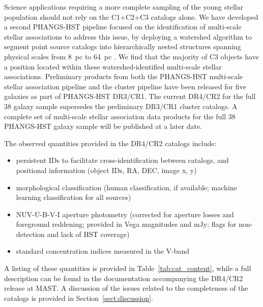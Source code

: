 \documentclass[linenumbers]{aastex63}
\begin{document}
Science applications requiring a more complete sampling of the young stellar population should not rely on the C1+C2+C3 catalogs alone.  We have developed a second PHANGS-HST pipeline focused on the identification of multi-scale stellar associations to address this issue, by deploying a watershed algorithm to segment point source catalogs into hierarchically nested structures spanning physical scales from 8~pc to 64~pc \citep{larson_multiscale_2023}.  We find that the majority of C3 objects have a position located within these watershed-identified multi-scale stellar associations. Preliminary products from both the PHANGS-HST multi-scale stellar association pipeline and the cluster pipeline have been released for five galaxies as part of PHANGS-HST DR3/CR1.  The current DR4/CR2 for the full 38 galaxy sample supersedes the preliminary DR3/CR1 cluster catalogs.  A complete set of multi-scale stellar association data products for the full 38 PHANGS-HST galaxy sample will be published at a later date. 

The observed quantities provided in the DR4/CR2 catalogs include:
\begin{itemize}
\item persistent IDs to facilitate cross-identification between catalogs, and positional information (object IDs, RA, DEC, image x, y)
\item morphological classification (human classification, if available; machine learning classification for all sources)
\item NUV-U-B-V-I aperture photometry (corrected for aperture losses and foreground reddening; provided in Vega magnitudes and mJy; flags for non-detection and lack of HST coverage)
\item standard concentration indices measured in the V-band
\end{itemize}

A listing of these quantities is provided in Table~\ref{tab:cat_content}, while a full description can be found in the documentation accompanying the DR4/CR2 release at MAST. {A discussion of the issues related to the completeness of the catalogs is provided in Section~\ref{sect:discussion}.}
\end{document}
